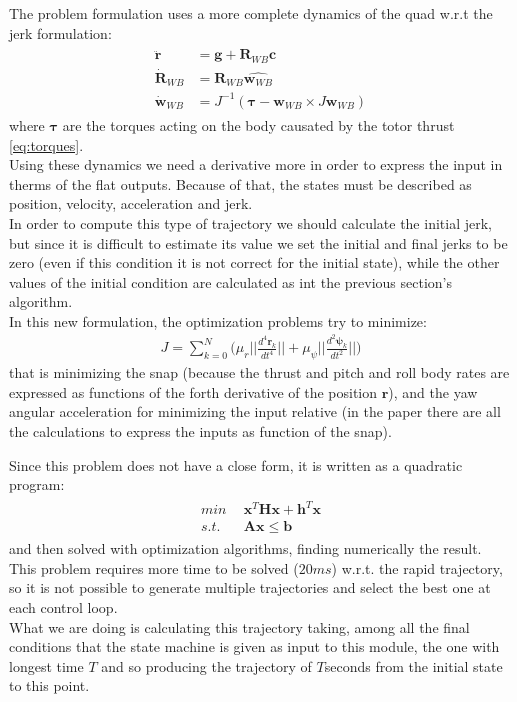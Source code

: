 The problem formulation uses a more complete dynamics of the quad w.r.t the jerk formulation:
\begin{align}
\begin{split}
\ddot{\boldsymbol{r}} &= \boldsymbol{g} + \boldsymbol{R}_{WB}\boldsymbol{c}  \\[10pt]
\dot{\boldsymbol{R}}_{WB} &= \boldsymbol{R}_{WB}\hat{\boldsymbol{w}_{WB}}  \\[10pt]
\dot{\boldsymbol{w}}_{WB} &= J^{-1} (\boldsymbol{\tau} - \boldsymbol{w}_{WB} \times J\boldsymbol{w}_{WB})
\end{split}
\end{align}
where $\boldsymbol{\tau}$ are the torques acting on the body causated by the totor thrust \ref{eq:torques}.\\
Using these dynamics we need a derivative more in order to express the input in therms of the flat outputs.
Because of that, the states must be described as position, velocity, acceleration and jerk. \\
In order to compute this type of trajectory we should calculate the initial jerk, but since it is difficult to estimate its value we set the initial and final jerks to be zero (even if this condition it is not correct for the initial state), while the other values of the initial condition are calculated as int the previous section's algorithm.\\

In this new formulation, the optimization problems try to minimize:
\begin{align}
J = \sum_{k=0}^N\Big( \mu_r \Big|\Big|\frac{d^{4}\boldsymbol{r}_k}{dt^{4}}\Big|\Big|  +  \mu_{\psi} \Big|\Big|\frac{d^{2}\boldsymbol{\psi}_k}{dt^{2}}\Big|\Big|\Big)
\end{align}
that is minimizing the snap (because the thrust and pitch and roll body rates are expressed as functions of the forth derivative of the position $\boldsymbol{r}$), and the yaw angular acceleration for minimizing the input relative (in the paper  \cite{mellinger2011minimum} there are all the calculations to express the inputs as function of the snap).

Since this problem does not have a close form, it is written as a quadratic program:
\begin{align}
\begin{split}
min & \ \ \boldsymbol{x}^T\boldsymbol{H}\boldsymbol{x} + \boldsymbol{h}^T\boldsymbol{x}\\[10pt]
s.t. &\ \ \boldsymbol{Ax} \leq \boldsymbol{b}
\end{split}
\end{align}
and then solved with optimization algorithms, finding numerically the result.\\ 
This problem requires more time to be solved ($20ms$) w.r.t. the rapid trajectory, so it is not possible to generate multiple trajectories and select the best one at each control loop.\\
What we are doing is calculating this trajectory taking, among all the final conditions that the state machine is given as input to this module, the one with longest time $T$ and so producing the trajectory of $T$seconds from the initial state to this point.

